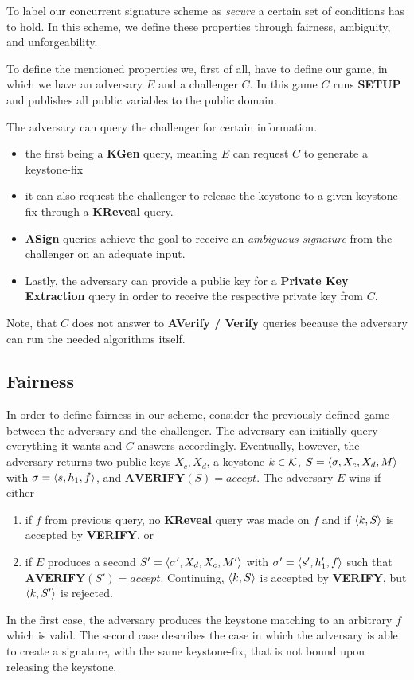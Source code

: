 To label our concurrent signature scheme as \textit{secure} a certain set of conditions has to hold. 
In this scheme, we define these properties through fairness, ambiguity, and unforgeability.

To define the mentioned properties we, first of all, have to define our game, in which we have an adversary \(E\) and a challenger \(C\).
In this game \(C\) runs \textbf{SETUP} and publishes all public variables to the public domain. 

The adversary can query the challenger for certain information. 
\begin{itemize}
  \item the first being a \textbf{KGen} query, meaning \(E\) can request \(C\) to generate a keystone-fix
  \item it can also request the challenger to release the keystone to a given keystone-fix through a \textbf{KReveal} query.
  \item \textbf{ASign} queries achieve the goal to receive an \textit{ambiguous signature} from the challenger on an adequate input. 
  \item Lastly, the adversary can provide a public key for a \textbf{Private Key Extraction} query in order to receive the respective private key from \(C\).
\end{itemize}

Note, that \(C\) does not answer to \textbf{AVerify / Verify} queries because the adversary can run the needed algorithms itself.

\subsection{Fairness}
  In order to define fairness in our scheme, consider the previously defined game between the adversary and the challenger.
  The adversary can initially query everything it wants and \(C\) answers accordingly.
  Eventually, however, the adversary returns two public keys \(X_c, X_d\), a keystone \(k\in\mathcal{K}\), \(S=\langle \sigma, X_c, X_d, M \rangle\) with \(\sigma=\langle s, h_1, f \rangle\), and \(\textbf{AVERIFY}(S) = accept\).
  The adversary \(E\) wins if either
    \begin{enumerate}
      \item if \(f\) from previous query, no \textbf{KReveal} query was made on \(f\) and if \(\langle k,S \rangle\) is accepted by \textbf{VERIFY}, or
      \item if \(E\) produces a second \(S' = \langle \sigma', X_d, X_c, M' \rangle\) with \(\sigma' = \langle s', h_1', f \rangle\) such that \(\textbf{AVERIFY}(S')=accept\).
            Continuing, \(\langle k,S \rangle\) is accepted by \textbf{VERIFY}, but  \(\langle k,S' \rangle\) is rejected.
    \end{enumerate}
  In the first case, the adversary produces the keystone matching to an arbitrary \(f\) which is valid.
  The second case describes the case in which the adversary is able to create a signature, with the same keystone-fix, that is not bound upon releasing the keystone.

